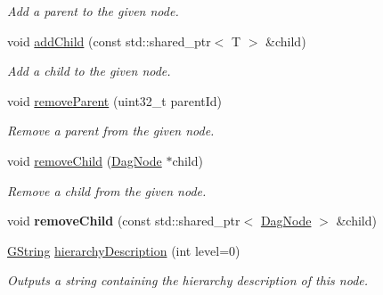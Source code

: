 \begin{Indent}
\begin{DoxyCompactItemize}
\begin{DoxyCompactList}\small\item\em Add a parent to the given node. \end{DoxyCompactList}\item 
\mbox{\label{classrev_1_1_dag_node_aff6a60114cf4ceb6066f5c01375a3d3c}} 
void \mbox{\hyperlink{classrev_1_1_dag_node_aff6a60114cf4ceb6066f5c01375a3d3c}{add\+Child}} (const std\+::shared\+\_\+ptr$<$ T $>$ \&child)
\begin{DoxyCompactList}\small\item\em Add a child to the given node. \end{DoxyCompactList}\item 
\mbox{\label{classrev_1_1_dag_node_a64984b715042050e4b01a155ce3252d1}} 
void \mbox{\hyperlink{classrev_1_1_dag_node_a64984b715042050e4b01a155ce3252d1}{remove\+Parent}} (uint32\+\_\+t parent\+Id)
\begin{DoxyCompactList}\small\item\em Remove a parent from the given node. \end{DoxyCompactList}\item 
\mbox{\label{classrev_1_1_dag_node_aa35a36c80b9b35a95ec36d88b1722fd0}} 
void \mbox{\hyperlink{classrev_1_1_dag_node_aa35a36c80b9b35a95ec36d88b1722fd0}{remove\+Child}} (\mbox{\hyperlink{classrev_1_1_dag_node}{Dag\+Node}} $\ast$child)
\begin{DoxyCompactList}\small\item\em Remove a child from the given node. \end{DoxyCompactList}\item 
\mbox{\label{classrev_1_1_dag_node_aebfc56762bc1b3b26d1c0842342c832a}} 
void {\bfseries remove\+Child} (const std\+::shared\+\_\+ptr$<$ \mbox{\hyperlink{classrev_1_1_dag_node}{Dag\+Node}} $>$ \&child)
\item 
\mbox{\label{classrev_1_1_dag_node_a57bd357a59e1afa0b766fedbfcadbfc5}} 
\mbox{\hyperlink{classrev_1_1_g_string}{G\+String}} \mbox{\hyperlink{classrev_1_1_dag_node_a57bd357a59e1afa0b766fedbfcadbfc5}{hierarchy\+Description}} (int level=0)
\begin{DoxyCompactList}\small\item\em Outputs a string containing the hierarchy description of this node. \end{DoxyCompactList}\end{DoxyCompactItemize}
\end{Indent}
